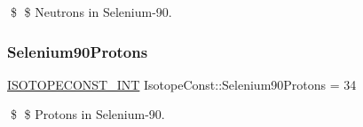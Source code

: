 \$ \$ Neutrons in Selenium-\/90. \mbox{\label{group___isotope_const-_selenium-_se90_ga0e2da876261891863c14ca2fee9c23a5}} 
\subsubsection{\texorpdfstring{Selenium90\+Protons}{Selenium90Protons}}
{\footnotesize\ttfamily \mbox{\hyperlink{group___isotope_const-_macros_ga5f18360b3e99483a35c32d789e62621c}{I\+S\+O\+T\+O\+P\+E\+C\+O\+N\+S\+T\+\_\+\+I\+NT}} Isotope\+Const\+::\+Selenium90\+Protons = 34}

\$ \$ Protons in Selenium-\/90. 